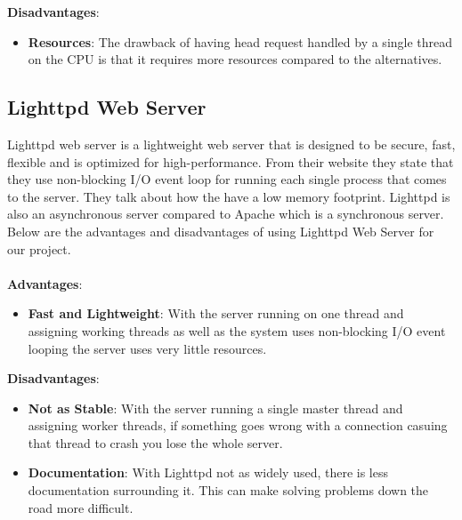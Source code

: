 \documentclass[onecolumn, draftclsnofoot,10pt, compsoc]{IEEEtran}
\begin{document}
		\noindent\textbf{Disadvantages}:
		\begin{itemize}
			\item \textbf{Resources}: The drawback of having head request
			handled by a single thread on the CPU is that it requires more resources
			compared to the alternatives.
		\end{itemize}

		\subsection{Lighttpd Web Server}
		Lighttpd web server is a lightweight web server that is designed to be secure,
		fast, flexible and is optimized for high-performance. From their website \cite{Lighttpd}
		they state that they use non-blocking I/O event loop for running each single
		process that comes to the server. They talk about how the have a low memory
		footprint. Lighttpd is also an asynchronous server compared to Apache which is
		a synchronous server. Below are the advantages and disadvantages of using
		Lighttpd Web Server for our project.
		\\\\
		\textbf{Advantages}:
		\begin{itemize}
			\item \textbf{Fast and Lightweight}: With the server running on one thread
			and assigning working threads as well as the system uses non-blocking I/O
			event looping the server uses very little resources.
		\end{itemize}
		\noindent\textbf{Disadvantages}:
		\begin{itemize}
			\item \textbf{Not as Stable}: With the server running a single master thread
			and assigning worker threads, if something goes wrong with a connection casuing
			that thread to crash you lose the whole server.
			\item \textbf{Documentation}: With Lighttpd not as widely used, there
			is less documentation surrounding it. This can make solving problems down the
			road more difficult.
		\end{itemize}
\end{document}
